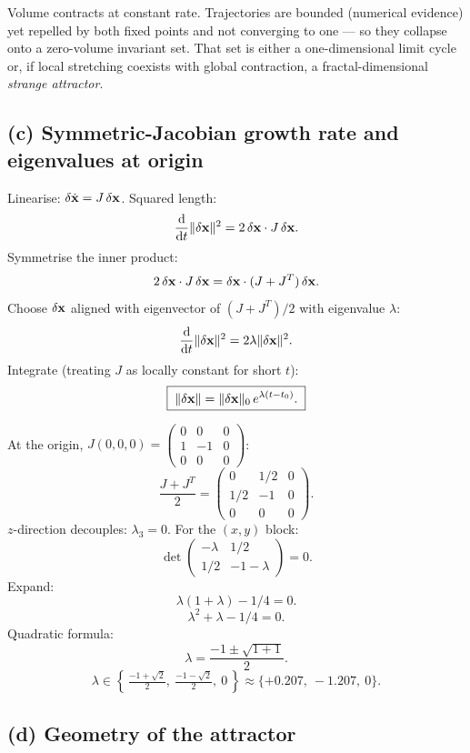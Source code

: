 \documentclass[11pt]{article}
\newcommand{\de}{\mathrm{d}}
\begin{document}
Volume contracts at constant rate. Trajectories are bounded (numerical evidence) yet repelled by both fixed points and not converging to one --- so they collapse onto a zero-volume invariant set. That set is either a one-dimensional limit cycle or, if local stretching coexists with global contraction, a fractal-dimensional \emph{strange attractor}.

\subsection*{(c) Symmetric-Jacobian growth rate and eigenvalues at origin}

Linearise: $\delta\dot{\vb x} = J\,\delta\vb x$. Squared length:
\[ \frac{\de}{\de t}\|\delta\vb x\|^2 = 2\,\delta\vb x\cdot J\,\delta\vb x. \]
Symmetrise the inner product:
\[ 2\,\delta\vb x\cdot J\,\delta\vb x = \delta\vb x\cdot(J+J^T)\,\delta\vb x. \]
Choose $\delta\vb x$ aligned with eigenvector of $(J+J^T)/2$ with eigenvalue $\lambda$:
\[ \frac{\de}{\de t}\|\delta\vb x\|^2 = 2\lambda\|\delta\vb x\|^2. \]
Integrate (treating $J$ as locally constant for short $t$):
\begin{equation}
\boxed{\;\|\delta\vb x\| = \|\delta\vb x\|_0\,e^{\lambda(t-t_0)}.\;}
\label{eq:symstretch}
\end{equation}

At the origin, $J(0,0,0) = \begin{pmatrix}0&0&0\\1&-1&0\\0&0&0\end{pmatrix}$:
\[ \frac{J+J^T}{2} = \begin{pmatrix} 0 & 1/2 & 0 \\ 1/2 & -1 & 0 \\ 0 & 0 & 0 \end{pmatrix}. \]
$z$-direction decouples: $\lambda_3 = 0$. For the $(x,y)$ block:
\[ \det\!\begin{pmatrix}-\lambda & 1/2 \\ 1/2 & -1-\lambda\end{pmatrix}=0. \]
Expand:
\[ \lambda(1+\lambda) - 1/4 = 0. \]
\[ \lambda^2 + \lambda - 1/4 = 0. \]
Quadratic formula:
\[ \lambda = \frac{-1\pm\sqrt{1+1}}{2}. \]
\[ \boxed{\;\lambda \in \left\{\,\tfrac{-1+\sqrt 2}{2},\ \tfrac{-1-\sqrt 2}{2},\ 0\,\right\} \approx \{+0.207,\ -1.207,\ 0\}.\;} \]

\subsection*{(d) Geometry of the attractor}
\end{document}
